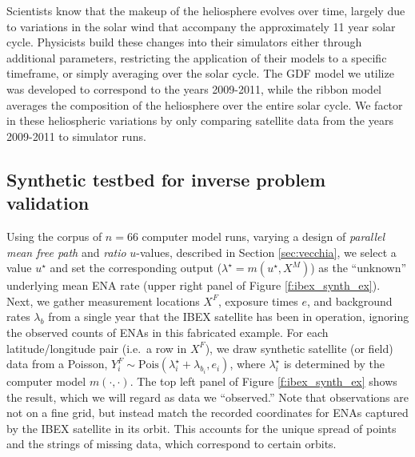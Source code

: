 \documentclass[11pt]{article}
\begin{document}
Scientists know that the makeup of the heliosphere evolves over time, largely
due to variations in the solar wind that accompany the approximately 11 year
solar cycle. Physicists build these changes into their simulators either through
additional parameters, restricting the application of their models to a specific
timeframe, or simply averaging over the solar cycle. The GDF model we utilize
was developed to correspond to the years 2009-2011, while the ribbon model
averages the composition of the heliosphere over the entire solar cycle. We
factor in these heliospheric variations by only comparing satellite data from
the years 2009-2011 to simulator runs.

\subsection{Synthetic testbed for inverse problem validation}
\label{sec:synth_data}

Using the corpus of $n=66$ computer model runs, varying a design of
\textit{parallel mean free path} and \textit{ratio} $u$-values, described in
Section \ref{sec:vecchia}, we select a value $u^\star$ and set the corresponding
output ($\lambda^\star = m(u^\star, X^M)$) as the {\color{red}``unknown''} underlying mean ENA
rate (upper right panel of Figure \ref{f:ibex_synth_ex}). Next, we gather
measurement locations $X^F$, exposure times $e$, and background rates
$\lambda_b$ from a single year that the IBEX satellite has been in operation,
ignoring the observed counts of ENAs in this fabricated example. For each
latitude/longitude pair (i.e.~a row in $X^F$), we draw synthetic satellite (or
field) data from a Poisson, $Y_i^F \sim
\mathrm{Pois}(\lambda^\star_i + \lambda_{b_{i}}, e_i)$, where $\lambda_i^\star$ is determined by the
computer model $m(\cdot,\cdot)$. The top left panel of Figure
\ref{f:ibex_synth_ex} shows the result, which we will regard as data we
``observed.'' Note that observations are not on a fine grid, but instead match
the recorded coordinates for ENAs captured by the IBEX satellite in its orbit.
This accounts for the unique spread of points and the strings of missing data,
which correspond to certain orbits.
\end{document}
